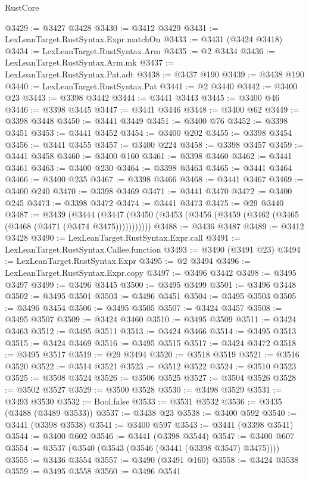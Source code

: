 \begin{lexlean}{RustCore}
\begin{coremodule}
@3429 := @3427 @3428
@3430 := @3412 @3429
@3431 := LexLeanTarget.RustSyntax.Expr.matchOn
@3433 := @3431 (@3424 @3418)
@3434 := LexLeanTarget.RustSyntax.Arm
@3435 := @2 @3434
@3436 := LexLeanTarget.RustSyntax.Arm.mk
@3437 := LexLeanTarget.RustSyntax.Pat.adt
@3438 := @3437 @190
@3439 := @3438 @190
@3440 := LexLeanTarget.RustSyntax.Pat
@3441 := @2 @3440
@3442 := @3400 @23
@3443 := @3398 @3442
@3444 := @3441 @3443
@3445 := @3400 @46
@3446 := @3398 @3445
@3447 := @3441 @3446
@3448 := @3400 @62
@3449 := @3398 @3448
@3450 := @3441 @3449
@3451 := @3400 @76
@3452 := @3398 @3451
@3453 := @3441 @3452
@3454 := @3400 @202
@3455 := @3398 @3454
@3456 := @3441 @3455
@3457 := @3400 @224
@3458 := @3398 @3457
@3459 := @3441 @3458
@3460 := @3400 @160
@3461 := @3398 @3460
@3462 := @3441 @3461
@3463 := @3400 @230
@3464 := @3398 @3463
@3465 := @3441 @3464
@3466 := @3400 @235
@3467 := @3398 @3466
@3468 := @3441 @3467
@3469 := @3400 @240
@3470 := @3398 @3469
@3471 := @3441 @3470
@3472 := @3400 @245
@3473 := @3398 @3472
@3474 := @3441 @3473
@3475 := @29 @3440
@3487 := @3439
    (@3444 (@3447 (@3450 (@3453 (@3456 (@3459 (@3462 (@3465 (@3468 (@3471 (@3474 @3475)))))))))))
@3488 := @3436 @3487
@3489 := @3412 @3428
@3490 := LexLeanTarget.RustSyntax.Expr.call
@3491 := LexLeanTarget.RustSyntax.Callee.function
@3493 := @3490 (@3491 @23)
@3494 := LexLeanTarget.RustSyntax.Expr
@3495 := @2 @3494
@3496 := LexLeanTarget.RustSyntax.Expr.copy
@3497 := @3496 @3442
@3498 := @3495 @3497
@3499 := @3496 @3445
@3500 := @3495 @3499
@3501 := @3496 @3448
@3502 := @3495 @3501
@3503 := @3496 @3451
@3504 := @3495 @3503
@3505 := @3496 @3454
@3506 := @3495 @3505
@3507 := @3424 @3457
@3508 := @3495 @3507
@3509 := @3424 @3460
@3510 := @3495 @3509
@3511 := @3424 @3463
@3512 := @3495 @3511
@3513 := @3424 @3466
@3514 := @3495 @3513
@3515 := @3424 @3469
@3516 := @3495 @3515
@3517 := @3424 @3472
@3518 := @3495 @3517
@3519 := @29 @3494
@3520 := @3518 @3519
@3521 := @3516 @3520
@3522 := @3514 @3521
@3523 := @3512 @3522
@3524 := @3510 @3523
@3525 := @3508 @3524
@3526 := @3506 @3525
@3527 := @3504 @3526
@3528 := @3502 @3527
@3529 := @3500 @3528
@3530 := @3498 @3529
@3531 := @3493 @3530
@3532 := Bool.false
@3533 := @3531 @3532
@3536 := @3435 (@3488 (@3489 @3533))
@3537 := @3438 @23
@3538 := @3400 @592
@3540 := @3441 (@3398 @3538)
@3541 := @3400 @597
@3543 := @3441 (@3398 @3541)
@3544 := @3400 @602
@3546 := @3441 (@3398 @3544)
@3547 := @3400 @607
@3554 := @3537 (@3540 (@3543 (@3546 (@3441 (@3398 @3547) @3475))))
@3555 := @3436 @3554
@3557 := @3490 (@3491 @160)
@3558 := @3424 @3538
@3559 := @3495 @3558
@3560 := @3496 @3541

\end{coremodule}
\end{lexlean}
